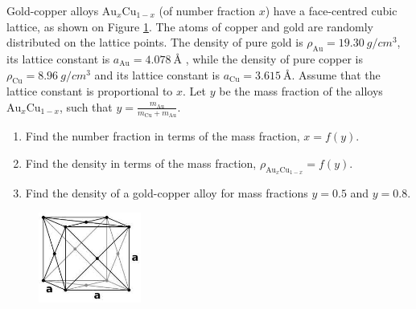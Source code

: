 \documentclass[../TST.tex]{subfiles}
\begin{document}
\begin{pproblem}
Gold-copper alloys $\mathrm{Au}_x\mathrm{Cu}_{1-x}$ (of number fraction $x$) have a face-centred cubic lattice, as shown on Figure \ref{fig2}. The atoms of copper and gold are randomly distributed on the lattice points. The density of pure gold is $\rho_\mathrm{Au}=\qty{19.30}{g/cm^3}$, its lattice constant is $a_\mathrm{Au}=\qty{4.078}{\angstrom}$ , while the density of pure copper is $\rho_\mathrm{Cu}=\qty{8.96}{g/cm^3}$ and its lattice constant is $a_\mathrm{Cu}=\qty{3.615}{\angstrom}$. Assume that the lattice constant is proportional to $x$. Let $y$ be the mass fraction of the alloys $\mathrm{Au}_x\mathrm{Cu}_{1-x}$, such that $y=\frac{m_\mathrm{Au}}{m_\mathrm{Cu}+m_\mathrm{Au}}$.
\begin{enumerate}
	\item Find the number fraction in terms of the mass fraction, $x=f(y)$.
	\item Find the density in terms of the mass fraction, $\rho_{\mathrm{Au}_x\mathrm{Cu}_{1-x}}=f(y)$.
	\item Find the density of a gold-copper alloy for mass fractions $y=0.5$ and $y=0.8$.
\end{enumerate}
\begin{figure}[h]
\centering
\hspace*{1ex}
\includegraphics[width=0.3\textwidth]{fig/2015_l4.jpg}
\caption{}
\label{fig2}
\end{figure}
\end{pproblem}
\end{document}
